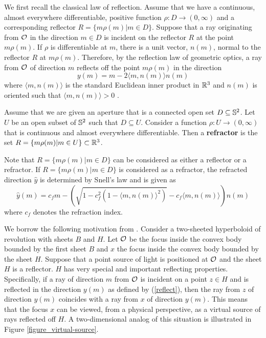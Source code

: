 \documentclass[review]{elsarticle}
\begin{document}
We first recall the classical law of reflection. Assume that we have a continuous, almost everywhere differentiable, positive function $\rho:D\to (0,\infty)$ and a corresponding reflector $R=\{m\rho(m)|m\in D\}.$ Suppose that a ray originating from $\mathcal{O}$ in the direction $m\in D$ is incident on the reflector $R$ at the point $m\rho(m)$. If $\rho$ is differentiable at $m$, there is a unit vector, $n(m)$, normal to the reflector $R$ at $m\rho(m)$. Therefore, by the reflection law of geometric optics, a ray from $\mathcal{O}$ of direction $m$ reflects off the point $m\rho(m)$ in the direction 
\begin{equation}\label{reflect}
    {y}(m)=m-2\langle m,n(m)\rangle n(m)
\end{equation}
where $\langle m,n(m)\rangle$ is the standard Euclidean inner product in $\mathbb{R}^3$ and $n(m)$ is oriented such that $\langle m,n(m)\rangle>0$ \cite{born_wolf_2019}. 

\begin{Def}\label{refractdef}
    Assume that we are given an aperture that is a connected open set $D\subseteq \mathbb{S}^2$.  Let $U$ be an open subset of $\mathbb{S}^2$ such that $D\subseteq U$. Consider a function $\rho:U\to (0,\infty)$ that is continuous and almost everywhere differentiable. Then a {\bf refractor} is the set $R=\{m\rho(m)|m\in U\}\subset \mathbb{R}^3$. 
\end{Def}

Note that $R=\{m\rho(m)|m\in D\}$ can be considered as either a reflector or a refractor. If $R=\{m\rho(m)|m\in D\}$ is considered as a refractor, the refracted direction $\hat{y}$ is determined by Snell's law and is given as 
\begin{equation}\label{refract}
    \hat{y}(m)=c_fm-\left(\sqrt{1-c_f^2(1-\langle m,n(m)\rangle^2)}-c_f\langle m,n(m)\rangle\right) n(m)
\end{equation}
where $c_f$ denotes the refraction index.

We borrow the following motivation from \cite{KOT}. Consider a two-sheeted hyperboloid of revolution with sheets $B$ and $H$. Let $\mathcal{O}$ be the focus inside the convex body bounded by the first sheet $B$ and $x$ the focus inside the convex body bounded by the sheet $H$. Suppose that a point source of light is positioned at $\mathcal{O}$ and the sheet $H$ is a reflector. $H$ has very special and important reflecting properties. Specifically, if a ray of direction $m$ from $\mathcal{O}$ is incident on a point $z\in H$ and is reflected in the direction $y(m)$ as defined by (\ref{reflect}), then the ray from $z$ of direction $y(m)$ coincides with a ray from $x$ of direction $y(m)$. This means that the focus $x$ can be viewed, from a physical perspective, as a virtual source of rays reflected off $H$. A two-dimensional analog of this situation is illustrated in Figure \ref{figure_virtual-source}.
\end{document}
